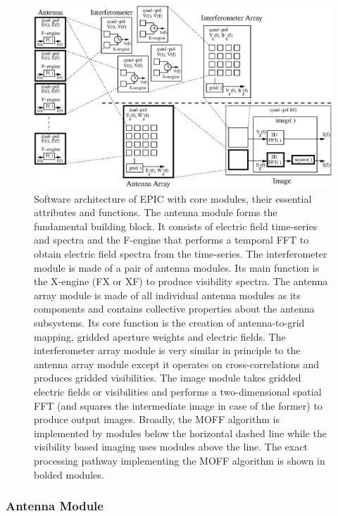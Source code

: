 \documentclass[a4paper,fleqn,usenatbib]{mnras}
\begin{document}
\begin{figure}
  \includegraphics[width=\linewidth]{EPIC-modules}
  \caption{Software architecture of EPIC with core modules, their essential
    attributes and functions. The antenna module forms the fundamental building 
    block. It consists of electric field time-series and spectra and the 
    F-engine that performs a temporal FFT to obtain electric field spectra from 
    the time-series. The interferometer module is made of a pair of antenna 
    modules. Its main function is the X-engine (FX or XF) to produce visibility 
    spectra. The antenna array module is made of all individual antenna modules
    as its components and contains collective properties about the antenna 
    subsystems. Its core function is the creation of antenna-to-grid mapping, 
    gridded aperture weights and electric fields. The interferometer array 
    module is very similar in principle to the antenna array module except it 
    operates on cross-correlations and produces gridded visibilities. The image 
    module takes gridded electric fields or visibilities and performs a 
    two-dimensional spatial FFT (and squares the intermediate image in case 
    of the former) to produce output images. Broadly, the MOFF algorithm is 
    implemented by modules below the horizontal dashed line while the visibility 
    based imaging uses modules above the line. The exact processing pathway 
    implementing the MOFF algorithm is shown in bolded modules.}
  \label{fig:software-modules}
\end{figure}

\subsubsection{Antenna Module}
\end{document}

